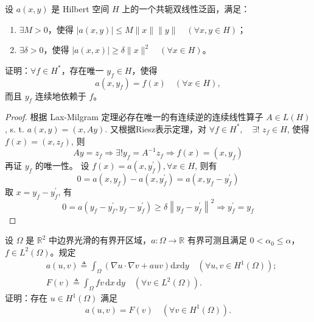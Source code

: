 \documentclass[lang=cn,newtx,10pt,scheme=chinese,thmcnt=chapter]{elegantbook}
\newcommand{\dif}{\mathrm{d}}
\begin{document}
\begin{problem}
设 $a(x, y)$ 是 Hilbert 空间 $H$ 上的一个共轭双线性泛函，满足：
\begin{enumerate}
    \item $\exists M > 0$，使得 $|a(x, y)| \leqslant M\|x\|\|y\| \quad (\forall x, y \in H)$；
    \item $\exists \delta > 0$，使得 $|a(x, x)| \geqslant \delta\|x\|^2 \quad (\forall x \in H)$。
\end{enumerate}
证明：$\forall f \in H^*$，存在唯一 $y_f \in H$，使得
\[
a\left(x, y_f\right) = f(x) \quad (\forall x \in H),
\]
而且 $y_f$ 连续地依赖于 $f$。
\end{problem}
\begin{proof}
 根据 Lax-Milgram 定理必存在唯一的有连续逆的连续线性算子 $A \in L ( H )$, s. t. $a(x, y)=(x, A y)$. 又根据Riesz表示定理，对 $\forall f \in H ^*, \quad \exists !$ $z_f \in H$, 使得 $f(x)=\left(x, z_f\right)$, 则
\begin{equation*}
A y=z_f \Rightarrow \exists ! y_f=A^{-1} z_f \Rightarrow f(x)=(x,y_f)
\end{equation*}
再证 $y_f$ 的唯一性。 设 $f(x)=a\left(x, y_f^{\prime}\right), \forall x \in H$, 则有
\begin{equation*}
0=a\left(x, y_f\right)-a\left(x, y_f^{\prime}\right)=a\left(x, y_f-y_f^{\prime}\right)
\end{equation*}
取 $x=y_f-y_f^{\prime}$, 有
\begin{equation*}
0=a\left(y_f-y_f^{\prime}, y_f-y_f^{\prime}\right){ }\geqslant \delta\left\|y_f-y_f^{\prime}\right\|^2 \Rightarrow y_f^{\prime}=y_f
\end{equation*}
\end{proof}
\begin{problem}
设 $\Omega$ 是 $\mathbb{R}^2$ 中边界光滑的有界开区域，$a: \Omega \rightarrow \mathbb{R}$ 有界可测且满足 $0 < \alpha_0 \leqslant \alpha$，$f \in {L}^2(\Omega)$。规定
\[
\begin{aligned}
& a(u, v) \triangleq \int_{\Omega} \left(\nabla u \cdot \nabla v + a u v\right) \dif x \dif y \quad (\forall u, v \in H^1(\Omega)); \\
& F(v) \triangleq \int_{\Omega} f v \, \dif x \, \dif y \quad (\forall v \in {L}^2(\Omega)).
\end{aligned}
\]
证明：存在 $u \in H^1(\Omega)$ 满足
\[
a(u, v) = F(v) \quad (\forall v \in H^1(\Omega)).
\]
\end{problem}
\end{document}
